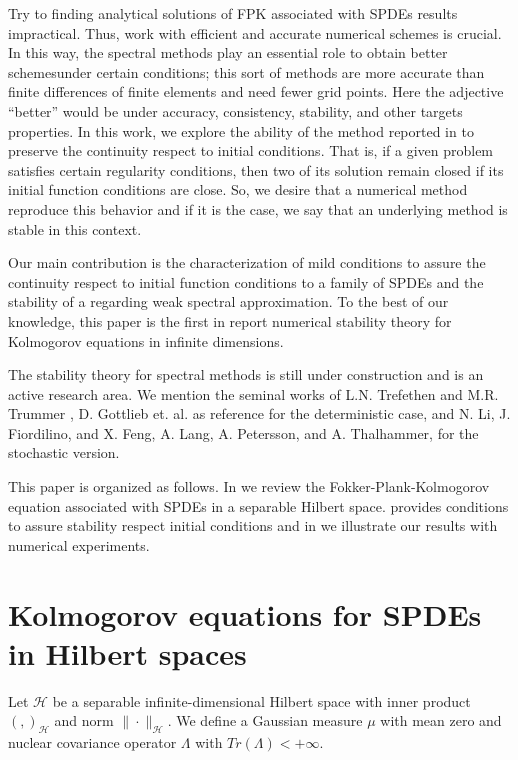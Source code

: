\documentclass[review,onefignum,onetabnum]{siamart190516}
\begin{document}
        Try to finding analytical solutions of FPK associated with SPDEs results
    impractical. Thus, work with efficient and accurate numerical schemes is 
    crucial. In this way, the spectral methods play an essential role to obtain 
    better schemes\textemdash under certain conditions; this sort of methods 
    are  more accurate than finite differences of finite elements and need 
    fewer grid points. Here the adjective ``better'' would be under accuracy, 
    consistency, stability, and other targets properties. In this work, we 
    explore the ability of the method reported in \cite{de-fl} to preserve the 
    continuity respect to initial conditions. That is, if a given problem 
    satisfies certain regularity conditions, then two of its solution remain 
    closed if its initial function conditions are close. So, we desire that a 
    numerical method reproduce this 
    behavior and if it is the case, we say that an underlying method is stable 
    in this context.
    
        Our main contribution is the characterization of mild conditions to
    assure the continuity respect to initial function conditions to a family of
    SPDEs and the stability of a regarding weak spectral approximation. 
    To the best of our knowledge, this paper is the first in report numerical 
    stability theory for Kolmogorov equations in infinite dimensions.
    
        The stability theory for spectral methods is still under 
    construction and is an active research area. We mention the seminal works of
    L.N. Trefethen and M.R. Trummer \cite{Trefethen1987}, D. Gottlieb et. al.
    \cite{Gottlieb1987a} as reference for the deterministic case, and N. Li, J.
    Fiordilino, and X. Feng, \cite{Li2019} A. Lang, A. Petersson,  and A.
    Thalhammer, \cite{Lang2017} for the stochastic version.
    
        This paper is organized as follows. In  we review the
    Fokker-Plank-Kolmogorov equation associated with SPDEs in
    a separable Hilbert space.  
    provides conditions to assure stability respect initial conditions and in 
     we illustrate our
    results with numerical experiments.

\section{Kolmogorov equations for SPDEs in Hilbert spaces}
\label{fpk-sect}
        Let $\mathcal{H}$ be a separable infinite-dimensional Hilbert space with
    inner product $( ,  )_\mathcal{H} $ and norm $\|\cdot\|_\mathcal{H}$. We 
    define a Gaussian measure $\mu$ with mean zero and nuclear covariance 
    operator $\Lambda$ with  $Tr(\Lambda)<+\infty$.
\end{document}
